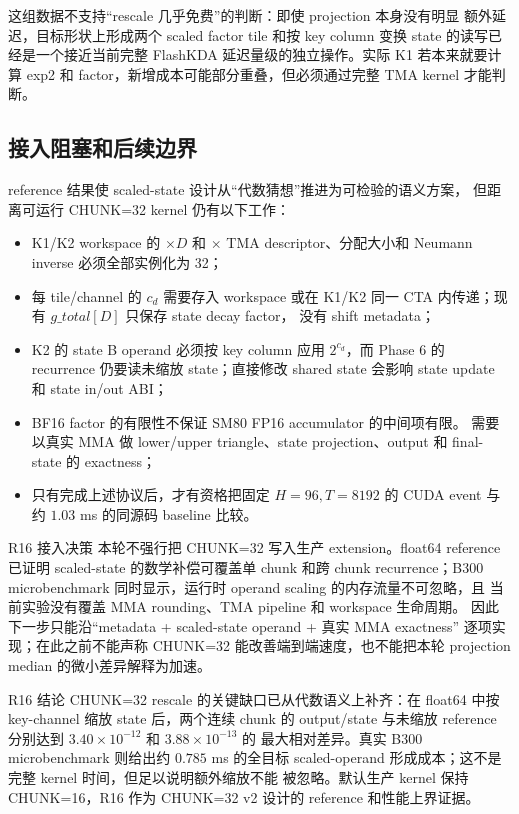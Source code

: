 这组数据不支持“rescale 几乎免费”的判断：即使 projection 本身没有明显
额外延迟，目标形状上形成两个 scaled factor tile 和按 key column 变换
state 的读写已经是一个接近当前完整 FlashKDA 延迟量级的独立操作。实际
K1 若本来就要计算 exp2 和 factor，新增成本可能部分重叠，但必须通过完整
TMA kernel 才能判断。

\subsection{接入阻塞和后续边界}

reference 结果使 scaled-state 设计从“代数猜想”推进为可检验的语义方案，
但距离可运行 CHUNK=32 kernel 仍有以下工作：

\begin{itemize}
  \item K1/K2 workspace 的 \(\times D\) 和
        \(\times\) TMA descriptor、分配大小和
        Neumann inverse 必须全部实例化为 32；
  \item 每 tile/channel 的 \(c_d\) 需要存入 workspace 或在 K1/K2
        同一 CTA 内传递；现有 \(g\_total[D]\) 只保存 state decay factor，
        没有 shift metadata；
  \item K2 的 state B operand 必须按 key column 应用 \(2^{c_d}\)，而
        Phase 6 的 recurrence 仍要读未缩放 state；直接修改 shared state
        会影响 state update 和 state in/out ABI；
  \item BF16 factor 的有限性不保证 SM80 FP16 accumulator 的中间项有限。
        需要以真实 MMA 做 lower/upper triangle、state projection、output
        和 final-state 的 exactness；
  \item 只有完成上述协议后，才有资格把固定 \(H=96,T=8192\) 的 CUDA event
        与约 \(1.03\) ms 的同源码 baseline 比较。
\end{itemize}

\begin{decision}{R16 接入决策}
本轮不强行把 CHUNK=32 写入生产 extension。float64 reference 已证明
scaled-state 的数学补偿可覆盖单 chunk 和跨 chunk recurrence；B300
microbenchmark 同时显示，运行时 operand scaling 的内存流量不可忽略，且
当前实验没有覆盖 MMA rounding、TMA pipeline 和 workspace 生命周期。
因此下一步只能沿“metadata + scaled-state operand + 真实 MMA exactness”
逐项实现；在此之前不能声称 CHUNK=32 能改善端到端速度，也不能把本轮
projection median 的微小差异解释为加速。
\end{decision}

\begin{record}{R16 结论}
CHUNK=32 rescale 的关键缺口已从代数语义上补齐：在 float64 中按
key-channel 缩放 state 后，两个连续 chunk 的 output/state 与未缩放
reference 分别达到 \(3.40\times10^{-12}\) 和 \(3.88\times10^{-13}\) 的
最大相对差异。真实 B300 microbenchmark 则给出约 \(0.785\) ms 的全目标
scaled-operand 形成成本；这不是完整 kernel 时间，但足以说明额外缩放不能
被忽略。默认生产 kernel 保持 CHUNK=16，R16 作为 CHUNK=32 v2 设计的
reference 和性能上界证据。
\end{record}

